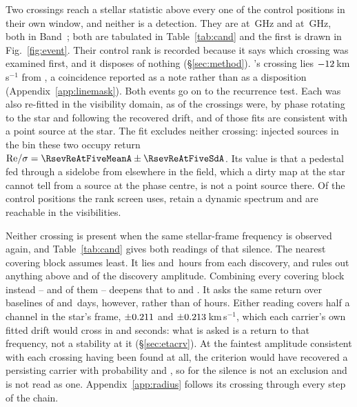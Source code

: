 Two crossings reach a stellar statistic above every one of the \NCtrl{}
control positions in their own window, and neither is a detection. They are
\EvAStar{} at \RqFreqSx\,GHz and \EvBStar{} at \RqFreqCp\,GHz, both in
Band~\EvABand; both are tabulated in Table~\ref{tab:cand} and the first is
drawn in Fig.~\ref{fig:event}. Their control rank is recorded because it says which crossing was examined
first, and it disposes of nothing (\S\ref{sec:method}).
\EvBStar's crossing lies $-12$\,km\,s$^{-1}$ from \EvBLine, a coincidence
reported as a note rather than as a disposition
(Appendix~\ref{app:linemask}). Both events go on to the recurrence test. Each was also re-fitted in the visibility domain, as \LgNFit{} of the
\NCross{} crossings were, by phase rotating to the star and following the
recovered drift, and \LgNLocalCor{} of those fits are consistent with a point
source at the star. The fit excludes neither crossing: injected sources in
the bin these two occupy return
${\rm Re}/\sigma=\RsevReAtFiveMeanA\pm\RsevReAtFiveSdA$. Its value is that a pedestal fed through a sidelobe from elsewhere in
the field, which a dirty map at the star cannot tell from a source at the
phase centre, is not a point source there. Of the \NCtrl{} control positions
the rank screen uses, \RcNRetCtrl{} retain a dynamic spectrum and
\RcNVisCtrl{} are reachable in the visibilities.

Neither crossing is present when the same stellar-frame frequency is observed
again, and Table~\ref{tab:cand} gives both readings of that silence. The nearest covering block assumes least. It lies \RcSxNearH{} and
\EvBDeepH\,hours from each discovery, and rules out anything above
\RqNearFracSx{} and \RqNearFracCp{} of the discovery amplitude. Combining every covering block instead -- \RqNRepSx{} and \RqNRepCp{} of
them -- deepens that to \RcSxFive{} and \RcCpFive. It asks the same return
over baselines of \RqSpanDSx{} and \RqSpanDCp\,days, however, rather than of
hours. Either
reading covers half a channel in the star's frame, $\pm0.211$ and
$\pm0.213$\,km\,s$^{-1}$, which each carrier's own fitted drift would
cross in \ZtSxLeaveSec{} and \ZtCpLeaveSec{} seconds: what is asked is a
return to that frequency, not a stability at it (\S\ref{sec:etacrv}). At the faintest amplitude consistent with each crossing
having been found at all, the criterion would have recovered a persisting
carrier with probability \RqPowerTrigSx{} and \RqPowerTrigCp, so for
\EvBStar{} the silence is not an exclusion and is not read as one.
Appendix~\ref{app:radius} follows its crossing through every step
of the chain.


